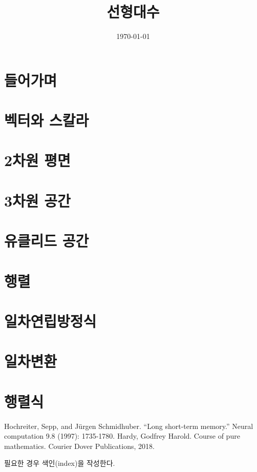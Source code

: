 \documentclass{book}
\begin{document}

\title{선형대수}
\author{}
\date{\today}
\maketitle

\renewcommand*\contentsname{목차}
\tableofcontents

\chapter*{들어가며}

\chapter{벡터와 스칼라}

\chapter{2차원 평면}

\chapter{3차원 공간}

\chapter{유클리드 공간}

\chapter{행렬}

\chapter{일차연립방정식}

\chapter{일차변환}

\chapter{행렬식}

\newpage
\renewcommand\bibname{참고문헌}
\begin{thebibliography}{AA}
 Hochreiter, Sepp, and Jürgen Schmidhuber. ``Long short-term memory.'' Neural computation 9.8 (1997): 1735-1780.
 Hardy, Godfrey Harold. Course of pure mathematics. Courier Dover Publications, 2018.
\end{thebibliography}

\bigskip


\renewcommand{\indexname}{색인}
\printindex
\bigskip

필요한 경우 색인(index)을 작성한다.
\end{document}
